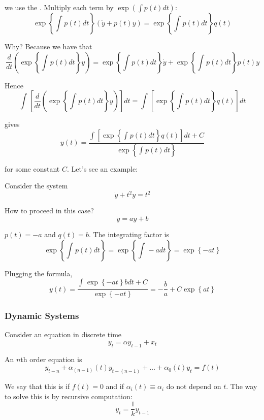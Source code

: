 \documentclass{article}
\begin{document}
we use the . Multiply each term by $\exp(\int p(t) dt)$:
\[
  \exp\left\{\int_{}^{} p(t) dt\right\}
  \left(\dot{y} + p(t) y\right)
  =
  \exp\left\{\int_{}^{} p(t) dt\right\}
  q(t)
\]

Why? Because we have that
\[
  \dfrac{d}{dt}
  \left(
    \exp\left\{\int_{}^{} p(t) dt\right\}
    y
  \right)
  =
  \exp\left\{\int_{}^{} p(t) dt\right\} \dot{y}
  +
  \exp\left\{\int_{}^{} p(t) dt\right\} p(t) y
\]

Hence
\[
  \int_{}^{}
  \left[
    \dfrac{d}{dt}
    \left(
      \exp\left\{\int_{}^{} p(t) dt\right\}
      y
    \right)
  \right]
  dt
  =
  \int_{}^{}
  \left[
    \exp\left\{\int_{}^{} p(t) dt\right\}
    q(t)
  \right]
  dt
\]

gives
\[
  y(t)
  =
  \dfrac{
    \int_{}^{}
    \left[
      \exp\left\{\int_{}^{} p(t) dt\right\}
      q(t)
    \right]
    dt
    +
    C
  }{
    \exp\left\{\int_{}^{} p(t) dt\right\}
  }
\]

for some constant $C$. Let's see an example:

\begin{example}
  Consider the system
  \[
    \dot{y} + t^2 y = t^2
  \]

  How to proceed in this case?
  \[
    \dot{y} = ay + b
  \]

  $p(t) = -a$ and $q(t) = b$. The integrating factor is
  \[
    \exp\left\{\int_{}^{} p(t) dt\right\}
    =
    \exp\left\{\int_{}^{} -a dt\right\}
    =
    \exp\left\{-at\right\}
  \]

  Plugging the formula,
  \[
    y(t) =
    \dfrac{
      \int_{}^{}
      \exp\left\{-at\right\} b dt
      + C
    }{
      \exp\left\{-at\right\}
    }
    =
    - \dfrac{b}{a}
    + C \exp\left\{at\right\}
  \]
\end{example}

\subsubsection{Dynamic Systems}
\label{ssub:dynamic_systems}

Consider an equation in discrete time
\[
  y_t = \alpha y_{t - 1} + x_t
\]

An $n$th order  equation is
\[
  y_{t - n}
  + \alpha_{(n - 1)}(t) y_{t - (n - 1)}
  + \ldots
  + \alpha_{0}(t) y_{t}
  =
  f(t)
\]

We say that this is  if $f(t) = 0$ and  if $\alpha_i(t) \equiv \alpha_i$ do not depend on $t$. The way to solve this is by recursive computation:
\[
  y_t = \dfrac{1}{k} y_{t - 1}
\]
\end{document}
